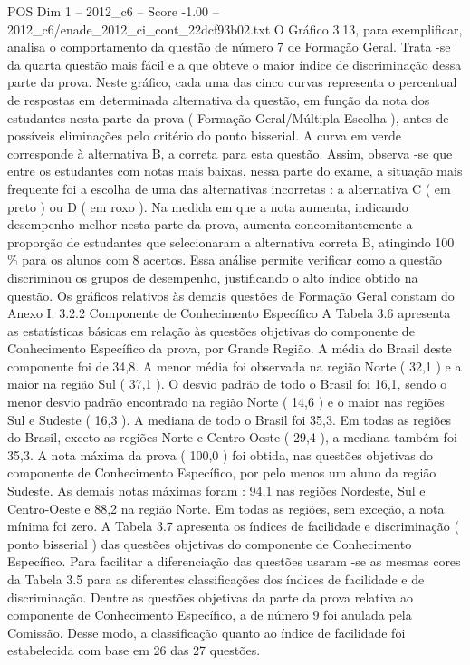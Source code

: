 \begin{textsample}{POS Dim 1 – 2012\_c6 – Score -1.00 – 2012\_c6/enade\_2012\_ci\_cont\_22dcf93b02.txt}
O Gráfico 3.13, para exemplificar, analisa o comportamento da questão de número 7 de Formação Geral.
Trata -se da quarta questão mais fácil e a que obteve o maior índice de discriminação dessa parte da prova.
Neste gráfico, cada uma das cinco curvas representa o percentual de respostas em determinada alternativa da questão, em função da nota dos estudantes nesta parte da prova ( Formação Geral/Múltipla Escolha ), antes de possíveis eliminações pelo critério do ponto bisserial.
A curva em verde corresponde à alternativa B, a correta para esta questão.
Assim, observa -se que entre os estudantes com notas mais baixas, nessa parte do exame, a situação mais frequente foi a escolha de uma das alternativas incorretas : a alternativa C ( em preto ) ou D ( em roxo ).
Na medida em que a nota aumenta, indicando desempenho melhor nesta parte da prova, aumenta concomitantemente a proporção de estudantes que selecionaram a alternativa correta B, atingindo 100 \% para os alunos com 8 acertos.
Essa análise permite verificar como a questão discriminou os grupos de desempenho, justificando o alto índice obtido na questão.
Os gráficos relativos às demais questões de Formação Geral constam do Anexo I. 3.2.2 Componente de Conhecimento Específico A Tabela 3.6 apresenta as estatísticas básicas em relação às questões objetivas do componente de Conhecimento Específico da prova, por Grande Região.
A média do Brasil deste componente foi de 34,8.
A menor média foi observada na região Norte ( 32,1 ) e a maior na região Sul ( 37,1 ).
O desvio padrão de todo o Brasil foi 16,1, sendo o menor desvio padrão encontrado na região Norte ( 14,6 ) e o maior nas regiões Sul e Sudeste ( 16,3 ).
A mediana de todo o Brasil foi 35,3.
Em todas as regiões do Brasil, exceto as regiões Norte e Centro-Oeste ( 29,4 ), a mediana também foi 35,3.
A nota máxima da prova ( 100,0 ) foi obtida, nas questões objetivas do componente de Conhecimento Específico, por pelo menos um aluno da região Sudeste.
As demais notas máximas foram : 94,1 nas regiões Nordeste, Sul e Centro-Oeste e 88,2 na região Norte.
Em todas as regiões, sem exceção, a nota mínima foi zero.
A Tabela 3.7 apresenta os índices de facilidade e discriminação ( ponto bisserial ) das questões objetivas do componente de Conhecimento Específico.
Para facilitar a diferenciação das questões usaram -se as mesmas cores da Tabela 3.5 para as diferentes classificações dos índices de facilidade e de discriminação.
Dentre as questões objetivas da parte da prova relativa ao componente de Conhecimento Específico, a de número 9 foi anulada pela Comissão.
Desse modo, a classificação quanto ao índice de facilidade foi estabelecida com base em 26 das 27 questões.

\end{textsample}
